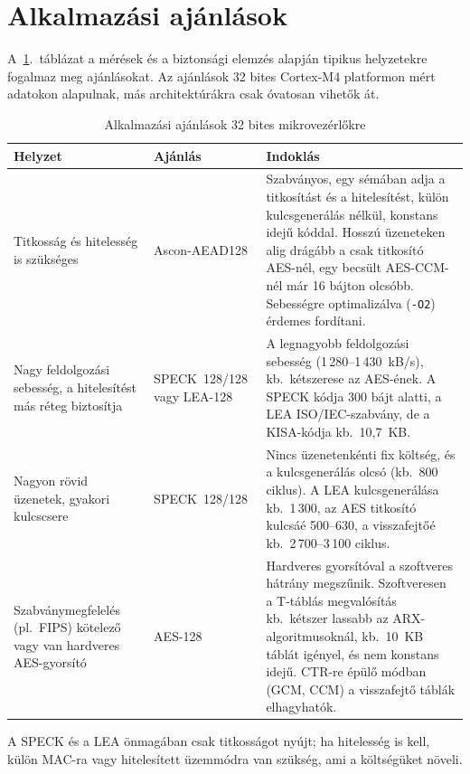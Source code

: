 \documentclass[a4paper,12pt]{report}
\theoremstyle{definition}
\theoremstyle{remark}
\begin{document}
\section{Alkalmazási ajánlások}

A~\ref{tab:ajanlasok}.~táblázat a mérések és a biztonsági elemzés alapján tipikus helyzetekre fogalmaz meg ajánlásokat. Az ajánlások 32 bites Cortex-M4 platformon mért adatokon alapulnak, más architektúrákra csak óvatosan vihetők át.

\begin{table}[htbp]
    \centering
    \small
    \caption{Alkalmazási ajánlások 32 bites mikrovezérlőkre}
    \label{tab:ajanlasok}
    \begin{tabularx}{\textwidth}{|p{4.2cm}|p{3.0cm}|X|}
        \hline
        \textbf{Helyzet} & \textbf{Ajánlás} & \textbf{Indoklás} \\ \hline
        Titkosság és hitelesség is szükséges & Ascon-AEAD128 & Szabványos, egy sémában adja a titkosítást és a hitelesítést, külön kulcsgenerálás nélkül, konstans idejű kóddal. Hosszú üzeneteken alig drágább a csak titkosító AES-nél, egy becsült AES-CCM-nél már 16 bájton olcsóbb. Sebességre optimalizálva (\texttt{-O2}) érdemes fordítani. \\ \hline
        Nagy feldolgozási sebesség, a hitelesítést más réteg biztosítja & SPECK~128/128 vagy LEA-128 & A legnagyobb feldolgozási sebesség (1\,280--1\,430~kB/s), kb.\ kétszerese az AES-ének. A SPECK kódja 300 bájt alatti, a LEA ISO/IEC-szabvány, de a KISA-kódja kb.\ 10,7~KB. \\ \hline
        Nagyon rövid üzenetek, gyakori kulcscsere & SPECK~128/128 & Nincs üzenetenkénti fix költség, és a kulcsgenerálás olcsó (kb.\ 800 ciklus). A LEA kulcsgenerálása kb.\ 1\,300, az AES titkosító kulcsáé 500--630, a visszafejtőé kb.\ 2\,700--3\,100 ciklus. \\ \hline
        Szabványmegfelelés (pl.\ FIPS) kötelező vagy van hardveres AES-gyorsító & AES-128 & Hardveres gyorsítóval a szoftveres hátrány megszűnik. Szoftveresen a T-táblás megvalósítás kb.\ kétszer lassabb az ARX-algoritmusoknál, kb.\ 10~KB táblát igényel, és nem konstans idejű. CTR-re épülő módban (GCM, CCM) a visszafejtő táblák elhagyhatók. \\ \hline
    \end{tabularx}
\end{table}

A SPECK és a LEA önmagában csak titkosságot nyújt; ha hitelesség is kell, külön MAC-ra vagy hitelesített üzemmódra van szükség, ami a költségüket növeli.
\end{document}
